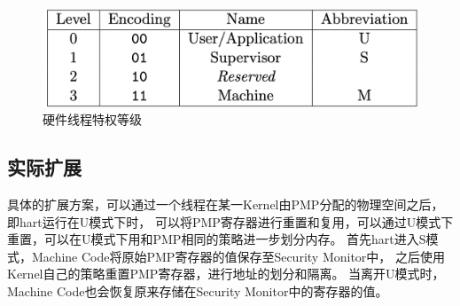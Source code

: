 \begin{figure}
    \centering
    \includegraphics[scale=0.30]{Figures/extend/level.png}
    \decoRule
    \caption{硬件线程特权等级}
    \label{fig:level}
\end{figure}

\subsection{实际扩展}
具体的扩展方案，可以通过一个线程在某一Kernel由PMP分配的物理空间之后，即hart运行在U模式下时，
可以将PMP寄存器进行重置和复用，可以通过U模式下重置，可以在U模式下用和PMP相同的策略进一步划分内存。
首先hart进入S模式，Machine Code将原始PMP寄存器的值保存至Security Monitor中，
之后使用Kernel自己的策略重置PMP寄存器，进行地址的划分和隔离。
当离开U模式时，Machine Code也会恢复原来存储在Security Monitor中的寄存器的值。



